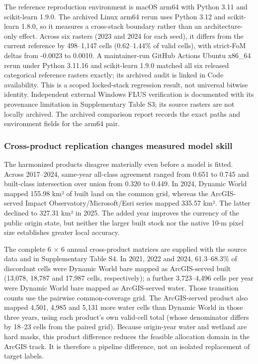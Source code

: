 The reference reproduction environment is macOS arm64 with Python 3.11
and scikit-learn 1.9.0. The archived Linux arm64 rerun uses Python 3.12
and scikit-learn 1.8.0, so it measures a cross-stack boundary rather
than an architecture-only effect. Across six rasters (2023 and 2024 for
each seed), it differs from the current reference by 498--1,147 cells
(0.62--1.44\% of valid cells), with strict-FoM deltas from -0.0023 to
0.0010. A maintainer-run GitHub Actions Ubuntu x86\_64 rerun under
Python 3.11.16 and scikit-learn 1.9.0 matched all six released
categorical reference rasters exactly; its archived audit is linked in
Code availability. This is a scoped locked-stack regression result, not
universal bitwise identity. Independent external Windows FLUS
verification is documented with its provenance limitation in
Supplementary Table S3; its source rasters are not locally archived. The
archived comparison report records the exact paths and environment
fields for the arm64 pair.

\subsubsection{Cross-product replication changes measured model
skill}\label{cross-product-replication-changes-measured-model-skill}

The harmonized products disagree materially even before a model is
fitted. Across 2017--2024, same-year all-class agreement ranged from
0.651 to 0.745 and built-class intersection over union from 0.320 to
0.449. In 2024, Dynamic World mapped 155.98 km² of built land on the
common grid, whereas the ArcGIS-served Impact Observatory/Microsoft/Esri
series mapped 335.57 km². The latter declined to 327.31 km² in 2025. The
added year improves the currency of the public origin state, but neither
the larger built stock nor the native 10-m pixel size establishes
greater local accuracy.

The complete 6 × 6 annual cross-product matrices are supplied with the
source data and in Supplementary Table S4. In 2021, 2022 and 2024,
61.3--68.3\% of discordant cells were Dynamic World bare mapped as
ArcGIS-served built (13,078, 18,787 and 17,987 cells, respectively); a
further 3,723--4,496 cells per year were Dynamic World bare mapped as
ArcGIS-served water. Those transition counts use the pairwise
common-coverage grid. The ArcGIS-served product also mapped 4,501, 4,985
and 5,131 more water cells than Dynamic World in those three years,
using each product's own valid-cell total (whose denominator differs by
18--23 cells from the paired grid). Because origin-year water and
wetland are hard masks, this product difference reduces the feasible
allocation domain in the ArcGIS track. It is therefore a pipeline
difference, not an isolated replacement of target labels.

